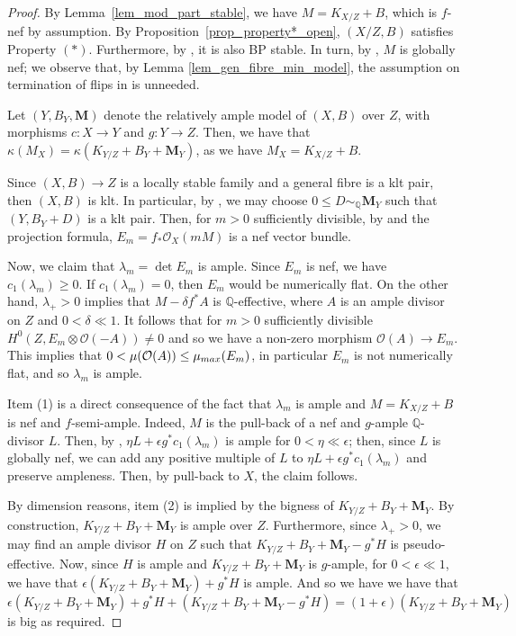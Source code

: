 \documentclass[12pt]{amsart}
\theoremstyle{plain}
\theoremstyle{definition}
\def\det{\operatorname{det}}
\def\rar{\rightarrow}
\def\K#1.{K_{#1}}
\begin{document}
\begin{proof}
By Lemma~\ref{lem_mod_part_stable}, we have $M=K_{X/Z}+B$, which is $f$-nef by assumption.
By Proposition~\ref{prop_property*_open}, $(X/Z,B)$ satisfies Property $(*)$.
Furthermore, by \cite[Theorem 2.11]{ACSS}, it is also BP stable.
In turn, by \cite[Theorem 4.4]{ACSS}, $M$ is globally nef;
we observe that, by Lemma \ref{lem_gen_fibre_min_model}, the assumption on termination of flips in 
\cite[Theorem 4.4]{ACSS} is unneeded.

Let $(Y,B_Y, \mathbf{M})$ denote the relatively ample model of $(X, B)$ over $Z$, 
with morphisms $c \colon X \rar Y$ and $g \colon Y \rar Z$.
Then, we have that $\kappa(M_X)=\kappa(\K Y/Z. + B_Y + \mathbf{M}_Y)$, as we have $M_X=\K X/Z. + B$.

Since $(X,B) \to Z$ is a locally stable family and a general fibre is a klt pair,
then $(X,B)$ is klt.
In particular, by \cite[Theorem 0.2]{Ambro05}, we may choose $0 \leq D \sim_{\mathbb Q} \mathbf M _Y$
such that $(Y,B_Y+D)$ is a klt pair.
Then, for $m>0$ sufficiently divisible, by \cite[Proposition 6.4]{CoPa21} and the projection formula,
$E_m = f_*\mathcal{O}_X(mM)$ is a nef vector bundle.

Now, we claim that $\lambda_m = \det E_m$ is ample.
Since $E_m$ is nef, we have $c_1(\lambda_m) \geq 0$.
If $c_1(\lambda_m)=0$, then $E_m$ would be numerically flat.
On the other hand, $\lambda_+ > 0$ implies that $M-\delta f^*A$ is $\mathbb Q$-effective,
where $A$ is an ample divisor on $Z$ and $0 < \delta \ll 1$.
It follows that for $m>0$ sufficiently divisible $H^0(Z, E_m \otimes \mathcal O(-A)) \neq 0$ and so we have a non-zero morphism $\mathcal O(A) \to E_m$.  This implies that $0<\mu(\mathcal O(A)) \leq \mu_{{\rm max}}(E_m)$, in particular $E_m$ is not numerically flat, and so 
$\lambda_m$ is ample.



Item (1) is a direct consequence of the fact that $\lambda_m$ is ample
and $M=K_{X/Z}+B$ is nef and $f$-semi-ample.
Indeed, $M$ is the pull-back of a nef and $g$-ample $\mathbb{Q}$-divisor $L$.
Then, by \cite[Proposition 1.7.10]{Lazarsfeld04a}, $\eta L + \epsilon g^*c_1(\lambda_m)$ is ample for $0 < \eta \ll \epsilon$;
then, since $L$ is globally nef, we can add any positive multiple of $L$ to $\eta L + \epsilon g^*c_1(\lambda_m)$ and preserve ampleness.
Then, by pull-back to $X$, the claim follows.

By dimension reasons, item (2) is implied by the bigness of  $\K Y/Z. + B_Y + \mathbf{M}_Y$.
By construction, $\K Y/Z. + B_Y + \mathbf{M}_Y$ is ample over $Z$.
Furthermore, since $\lambda_+>0$, we may find an ample divisor $H$ on $Z$ such that 
$\K Y/Z. + B_Y + \mathbf{M}_Y - g^* H$ is pseudo-effective.
Now, since $H$ is ample and $\K Y/Z. + B_Y + \mathbf{M}_Y$ is $g$-ample, for $0 < \epsilon \ll 1$, 
we have that $\epsilon(\K Y/Z. + B_Y+\mathbf{M}_Y) + g^*H$ is ample.
And so we have we have that
\[
\epsilon(\K Y/Z. + B_Y + \mathbf{M}_Y)+g^*H + (\K Y/Z. + B_Y + \mathbf{M}_Y - g^* H) = 
(1+\epsilon)(\K Y/Z. + B_Y +\mathbf{M}_Y)
\]
is big as required.
\end{proof}
\end{document}
